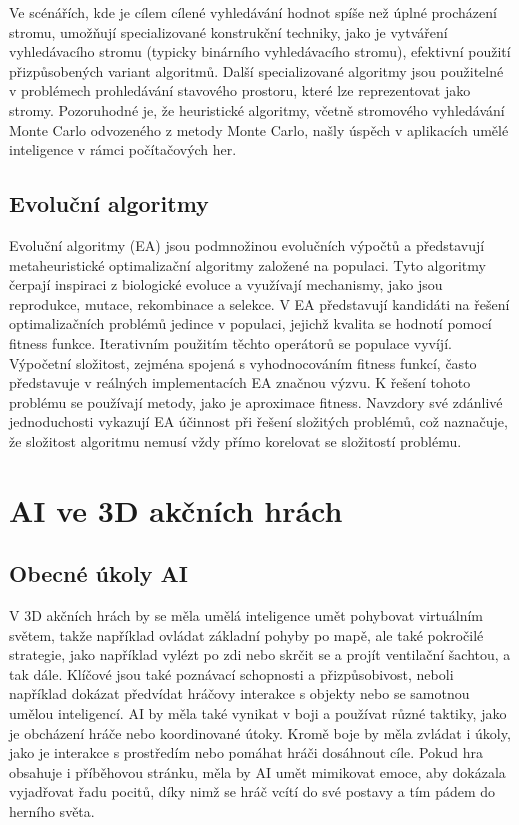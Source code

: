 Ve scénářích, kde je cílem cílené vyhledávání hodnot spíše než úplné procházení stromu, umožňují specializované konstrukční techniky, jako je vytváření vyhledávacího stromu (typicky binárního vyhledávacího stromu), efektivní použití přizpůsobených variant algoritmů. Další specializované algoritmy jsou použitelné v problémech prohledávání stavového prostoru, které lze reprezentovat jako stromy. Pozoruhodné je, že heuristické algoritmy, včetně stromového vyhledávání Monte Carlo odvozeného z metody Monte Carlo, našly úspěch v aplikacích umělé inteligence v rámci počítačových her.

\subsection{Evoluční algoritmy}
Evoluční algoritmy (EA)\cite{Yu2010} jsou podmnožinou evolučních výpočtů a představují metaheuristické optimalizační algoritmy založené na populaci. Tyto algoritmy čerpají inspiraci z biologické evoluce a využívají mechanismy, jako jsou reprodukce, mutace, rekombinace a selekce. V EA představují kandidáti na řešení optimalizačních problémů jedince v populaci, jejichž kvalita se hodnotí pomocí fitness funkce. Iterativním použitím těchto operátorů se populace vyvíjí. Výpočetní složitost, zejména spojená s vyhodnocováním fitness funkcí, často představuje v reálných implementacích EA značnou výzvu. K řešení tohoto problému se používají metody, jako je aproximace fitness. Navzdory své zdánlivé jednoduchosti vykazují EA účinnost při řešení složitých problémů, což naznačuje, že složitost algoritmu nemusí vždy přímo korelovat se složitostí problému.

\newpage

\section{AI ve 3D akčních hrách}
\subsection{Obecné úkoly AI}
V 3D akčních hrách by se měla umělá inteligence umět pohybovat virtuálním světem, takže například ovládat základní pohyby po mapě, ale také pokročilé strategie, jako například vylézt po zdi nebo skrčit se a projít ventilační šachtou, a tak dále. Klíčové jsou také poznávací schopnosti a přizpůsobivost, neboli například dokázat předvídat hráčovy interakce s objekty nebo se samotnou umělou inteligencí. AI by měla také vynikat v boji a používat různé taktiky, jako je obcházení hráče nebo koordinované útoky. Kromě boje by měla zvládat i úkoly, jako je interakce s prostředím nebo pomáhat hráči dosáhnout cíle. Pokud hra obsahuje i příběhovou stránku, měla by AI umět mimikovat emoce, aby dokázala vyjadřovat řadu pocitů, díky nimž se hráč vcítí do své postavy a tím pádem do herního světa.

